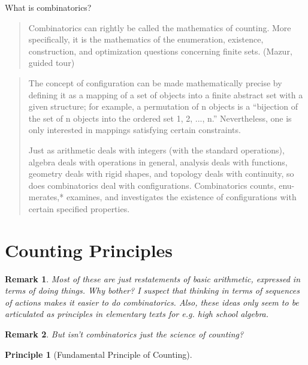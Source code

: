 \documentclass[reqno,12pt]{tufte-book}
\numberwithin{equation}{subsection}
\newtheorem{principle}{Principle}
\newtheorem{remark}{Remark}
\begin{document}
\cite{berge_principles_1971}

What is combinatorics?

\blockquote{Combinatorics can rightly be called the mathematics of counting. More speciﬁcally, it
is the mathematics of the enumeration, existence, construction, and optimization questions
concerning ﬁnite sets. (Mazur, guided tour)}

\blockquote{The concept of configuration can be made mathematically precise by defining it as a mapping of a set of objects into a finite abstract set with a given structure; for example, a permutation of n objects is a “bijection of the set of n objects into the ordered set 1, 2, ..., n.” Nevertheless, one is only interested in mappings satisfying certain constraints.

Just as arithmetic deals with integers (with the standard operations), algebra deals with operations in general, analysis deals with functions, geometry deals with rigid shapes, and topology deals with continuity, so does combinatorics deal with configurations. Combinatorics counts, enu- merates,* examines, and investigates the existence of configurations with certain specified properties.
}

\section{Counting Principles}

\begin{remark}
  Most of these are just restatements of basic arithmetic, expressed
  in terms of doing things.  Why bother?  I suspect that thinking in
  terms of sequences of actions makes it easier to do combinatorics.
  Also, these ideas only seem to be articulated as principles in
  elementary texts for e.g. high school algebra.
\end{remark}

\begin{remark}
  But isn't combinatorics just the science of counting?
\end{remark}

\begin{principle}[Fundamental Principle of Counting]

\end{principle}
\end{document}
